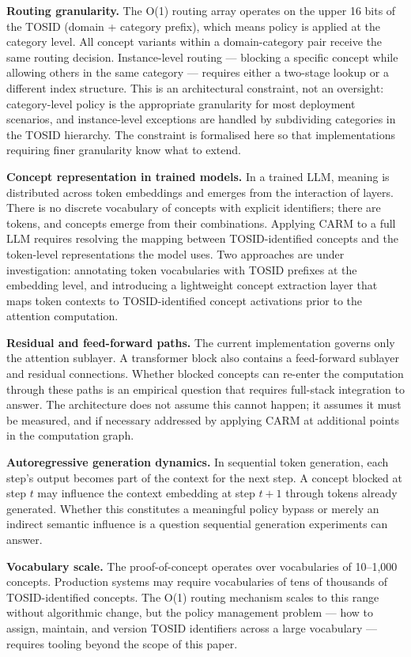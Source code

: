 \documentclass[11pt,a4paper]{article}
\theoremstyle{definition}
\begin{document}
\textbf{Routing granularity.} The O(1) routing array operates on the upper
16 bits of the TOSID (domain + category prefix), which means policy is
applied at the category level. All concept variants within a domain-category
pair receive the same routing decision. Instance-level routing --- blocking
a specific concept while allowing others in the same category --- requires
either a two-stage lookup or a different index structure. This is an
architectural constraint, not an oversight: category-level policy is the
appropriate granularity for most deployment scenarios, and instance-level
exceptions are handled by subdividing categories in the TOSID hierarchy.
The constraint is formalised here so that implementations requiring
finer granularity know what to extend.

\textbf{Concept representation in trained models.} In a trained LLM, meaning
is distributed across token embeddings and emerges from the interaction of
layers. There is no discrete vocabulary of concepts with explicit identifiers;
there are tokens, and concepts emerge from their combinations. Applying CARM
to a full LLM requires resolving the mapping between TOSID-identified concepts
and the token-level representations the model uses. Two approaches are under
investigation: annotating token vocabularies with TOSID prefixes at the
embedding level, and introducing a lightweight concept extraction layer that
maps token contexts to TOSID-identified concept activations prior to the
attention computation.

\textbf{Residual and feed-forward paths.} The current implementation governs
only the attention sublayer. A transformer block also contains a feed-forward
sublayer and residual connections. Whether blocked concepts can re-enter the
computation through these paths is an empirical question that requires
full-stack integration to answer. The architecture does not assume this cannot
happen; it assumes it must be measured, and if necessary addressed by applying
CARM at additional points in the computation graph.

\textbf{Autoregressive generation dynamics.} In sequential token generation,
each step's output becomes part of the context for the next step. A concept
blocked at step $t$ may influence the context embedding at step $t+1$ through
tokens already generated. Whether this constitutes a meaningful policy bypass
or merely an indirect semantic influence is a question sequential generation
experiments can answer.

\textbf{Vocabulary scale.} The proof-of-concept operates over vocabularies of
10--1,000 concepts. Production systems may require vocabularies of tens of
thousands of TOSID-identified concepts. The O(1) routing mechanism scales to
this range without algorithmic change, but the policy management problem ---
how to assign, maintain, and version TOSID identifiers across a large
vocabulary --- requires tooling beyond the scope of this paper.
\end{document}
